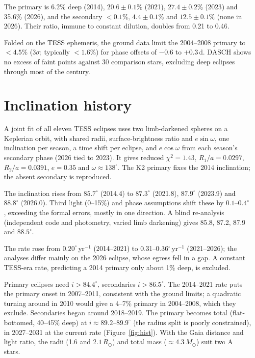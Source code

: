 \documentclass{aastex701}
\begin{document}
The primary is 6.2\% deep (2014), $20.6\pm0.1\%$ (2021), $27.4\pm0.2\%$ (2023) and
35.6\% (2026), and the secondary $<0.1\%$, $4.4\pm0.1\%$ and $12.5\pm0.1\%$ (none in 2026). Their ratio, immune
to constant dilution, doubles from 0.21 to 0.46.

Folded on the TESS ephemeris, the ground data limit the 2004--2008 primary to $<4.5\%$ ($3\sigma$; typically
$<1.6\%$) for phase offsets of $-0.6$ to $+0.3$\,d. DASCH shows no excess of faint points against 30
comparison stars, excluding deep eclipses through most of the century.

\section{Inclination history}

A joint fit of all eleven TESS eclipses uses two limb-darkened spheres on a Keplerian orbit, with shared radii,
surface-brightness ratio and $e\sin\omega$, one inclination per season, a time shift per eclipse, and
$e\cos\omega$ from each season's secondary phase (2026 tied to 2023). It gives reduced
$\chi^2=1.43$, $R_1/a=0.0297$, $R_2/a=0.0391$, $e=0.35$ and $\omega\approx138^\circ$. The K2 primary fixes the
2014 inclination; the absent secondary is reproduced.

The inclination rises from $85.7^\circ$ (2014.4) to $87.3^\circ$ (2021.8), $87.9^\circ$ (2023.9) and
$88.8^\circ$ (2026.0). Third light (0--15\%) and phase assumptions shift these by $0.1$--$0.4^\circ$, exceeding
the formal errors, mostly in one direction. A blind re-analysis (independent code and photometry, varied
limb darkening) gives 85.8, 87.2, 87.9 and $88.5^\circ$.

The rate rose from $0.20^\circ$\,yr$^{-1}$ (2014--2021) to 0.31--0.36$^\circ$\,yr$^{-1}$ (2021--2026); the
analyses differ mainly on the 2026 eclipse, whose egress fell in a gap. A constant TESS-era rate, predicting a 2014
primary only about 1\% deep, is excluded.

Primary eclipses need $i>84.4^\circ$, secondaries $i>86.5^\circ$. The 2014--2021 rate puts the primary onset in
2007--2011, consistent with the ground limits; a quadratic turning around in 2010 would give a 4--7\% primary in
2004--2008, which they exclude. Secondaries began around 2018--2019. The primary becomes total (flat-bottomed,
40--45\% deep) at $i\approx89.2$--$89.9^\circ$ (the radius split is poorly constrained), in 2027--2031 at the
current rate (Figure~\ref{fig:hist}). With the Gaia distance and light ratio, the radii (1.6 and
$2.1\,R_\odot$) and total mass ($\approx4.3\,M_\odot$) suit two A stars.
\end{document}
